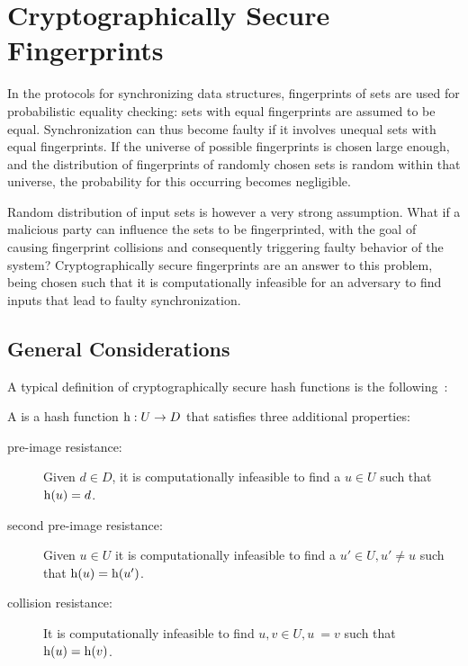 \section{Cryptographically Secure Fingerprints}
\label{crypto}

In the protocols for synchronizing data structures, fingerprints of sets are used for probabilistic equality checking: sets with equal fingerprints are assumed to be equal. Synchronization can thus become faulty if it involves unequal sets with equal fingerprints. If the universe of possible fingerprints is chosen large enough, and the distribution of fingerprints of randomly chosen sets is random within that universe, the probability for this occurring becomes negligible.

Random distribution of input sets is however a very strong assumption. What if a malicious party can influence the sets to be fingerprinted, with the goal of causing fingerprint collisions and consequently triggering faulty behavior of the system? Cryptographically secure fingerprints are an answer to this problem, being chosen such that it is computationally infeasible for an adversary to find inputs that lead to faulty synchronization.

\subsection{General Considerations}
\label{crypto-general}

A typical definition of cryptographically secure hash functions is the following~\cite{menezes2018handbook}:

\begin{definition}
A  is a hash function ${\operatorname{h}}: {U} \rightarrow {D}$ that satisfies three additional properties:

\begin{description}
  \item[pre-image resistance:] Given $d \in D$, it is computationally infeasible to find a $u \in U$ such that $\operatorname{h}(u) = d$.
  \item[second pre-image resistance:] Given $u \in U$ it is computationally infeasible to find a $u' \in U, u' \neq u$ such that $\operatorname{h}(u) = \operatorname{h}(u')$.
  \item[collision resistance:] It is computationally infeasible to find $u, v \in U, u ~= v$ such that $\operatorname{h}(u) = \operatorname{h}(v)$.
\end{description}
\end{definition}


